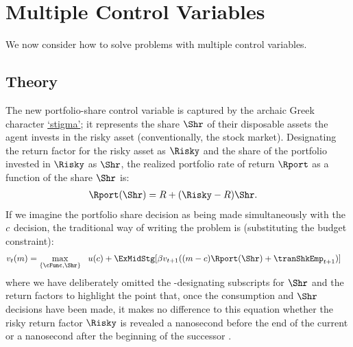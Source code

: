 \documentclass[SolvingMicroDSOPs]{subfiles}
\begin{document}
\hypertarget{multiple-control-variables}{}
\section{Multiple Control Variables}\label{sec:multiple-control-variables}
We now consider how to solve problems with multiple control variables.  

\subsection{Theory}\label{subsec:MCTheory}

The new portfolio-share control variable is captured by the archaic Greek character \href{https://en.wikipedia.org/wiki/Stigma_(ligature)}{`stigma'}; it represents the share $\Shr$ of their disposable assets the agent invests in the risky asset (conventionally, the stock market).  Designating the return factor for the risky asset as $\Risky$ and the share of the portfolio invested in $\Risky$ as $\Shr$, the realized portfolio rate of return $\Rport$ as a function of the share $\Shr$ is:
\begin{equation}\begin{gathered}\begin{aligned}
      \Rport(\Shr) &= \Rfree+(\Risky-\Rfree)\Shr \label{eq:Shr}.
    \end{aligned}\end{gathered}\end{equation}
If we imagine the portfolio share decision as being made simultaneously with the $c$ decision, the traditional way of writing the problem is (substituting the budget constraint):
\begin{equation}\begin{gathered}\begin{aligned}
      \vFunc_{\prd}(m)  & = \max_{\{\cFunc,\Shr\}} ~~  \uFunc(c) + \ExMidStg[\DiscFac \vFunc_{\prd+1}((m-c)\Rport(\Shr) + {\tranShkEmp}_{\prd+1})] \label{eq:Bellmanundated}
    \end{aligned}\end{gathered}\end{equation}
where we have deliberately omitted the {\interval}-designating subscripts for $\Shr$ and the return factors to highlight the point that, once the consumption and $\Shr$ decisions have been made, it makes no difference to this equation whether the risky return factor $\Risky$ is revealed a nanosecond before the end of the current {\interval} or a nanosecond after the beginning of the successor {\interval}.
\end{document}
